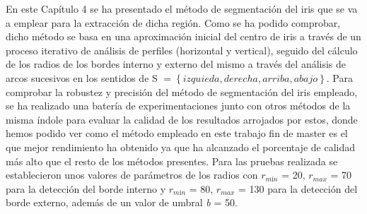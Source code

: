 En este Capítulo 4 se ha presentado el método de segmentación del iris que se va a emplear para la extracción de dicha región. Como se ha podido comprobar, dicho método se basa en una aproximación inicial del centro de iris a través de un proceso iterativo de análisis de perfiles (horizontal y vertical), seguido del cálculo de los radios de los bordes interno y externo del mismo a través del análisis de arcos sucesivos en los sentidos de S $ = \left \{ \left. izquieda, derecha, arriba, abajo \right \} \right.$. Para comprobar la robustez y precisión del método de segmentación del iris empleado, se ha realizado una batería de experimentaciones junto con otros métodos de la misma índole para evaluar la calidad de los resultados arrojados por estos, donde hemos podido ver como el método empleado en este trabajo fin de master es el que mejor rendimiento ha obtenido ya que ha alcanzado el porcentaje de calidad más alto que el resto de los métodos presentes. Para las pruebas realizada se establecieron unos valores de parámetros de los radios con  $r_{mín}$ = 20, $r_{max}$ = 70 para la detección del borde interno y $r_{mín}$ = 80, $r_{max}$ = 130 para la detección del borde externo, además de un valor de umbral \textit{b} = 50.\\

